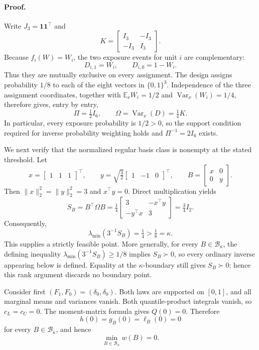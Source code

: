 \paragraph{Proof.}
Write \(J_3=\mathbf 1\mathbf 1^{\top}\) and
\[
K=
\begin{bmatrix}
I_3&-I_3\\
-I_3&I_3
\end{bmatrix}.
\]
Because \(f_i(W)=W_i\), the two exposure events for unit \(i\) are complementary:
\[
D_{i,1}=W_i,
\qquad
D_{i,0}=1-W_i.
\]
Thus they are mutually exclusive on every assignment.  The design assigns probability \(1/8\) to each of the eight vectors in \(\{0,1\}^3\).  Independence of the three assignment coordinates, together with \(\mathbb E_\nu W_i=1/2\) and \(\operatorname{Var}_\nu(W_i)=1/4\), therefore gives, entry by entry,
\[
\Pi=\tfrac12 I_6,
\qquad
\Omega=\operatorname{Var}_\nu(D)=\tfrac14K.
\]
In particular, every exposure probability is \(1/2>0\), so the support condition required for inverse probability weighting holds and \(\Pi^{-1}=2I_6\) exists.

We next verify that the normalized regular basis class is nonempty at the stated threshold.  Let
\[
x=
\begin{bmatrix}
1&1&1
\end{bmatrix}^{\top},
\qquad
y=\sqrt{\tfrac32}
\begin{bmatrix}
1&-1&0
\end{bmatrix}^{\top},
\qquad
B=
\begin{bmatrix}
x&0\\
0&y
\end{bmatrix}.
\]
Then \(\lVert x\rVert_2^2=\lVert y\rVert_2^2=3\) and \(x^{\top}y=0\).  Direct multiplication yields
\[
S_B=B^{\top}\Omega B
=\tfrac14
\begin{bmatrix}
3&-x^{\top}y\\
-y^{\top}x&3
\end{bmatrix}
=\tfrac34 I_2.
\]
Consequently,
\[
\lambda_{\min}(3^{-1}S_B)=\tfrac14>\tfrac18=\kappa.
\]
This supplies a strictly feasible point.  More generally, for every \(B\in\mathcal B_\kappa\), the defining inequality \(\lambda_{\min}(3^{-1}S_B)\ge 1/8\) implies \(S_B\succ0\), so every ordinary inverse appearing below is defined.  Equality at the \(\kappa\)-boundary still gives \(S_B\succ0\); hence this rank argument discards no boundary point.

Consider first \((F_1,F_0)=(\delta_0,\delta_0)\).  Both laws are supported on \([0,1]\), and all marginal means and variances vanish.  Both quantile-product integrals vanish, so \(c_L=c_U=0\).  The moment-matrix formula gives \(Q(0)=0\).  Therefore
\[
h(0)=g_B(0)=\ell_B(0)=0
\]
for every \(B\in\mathcal B_\kappa\), and hence
\[
\min_{B\in\mathcal B_\kappa}w(B)=0.
\]

